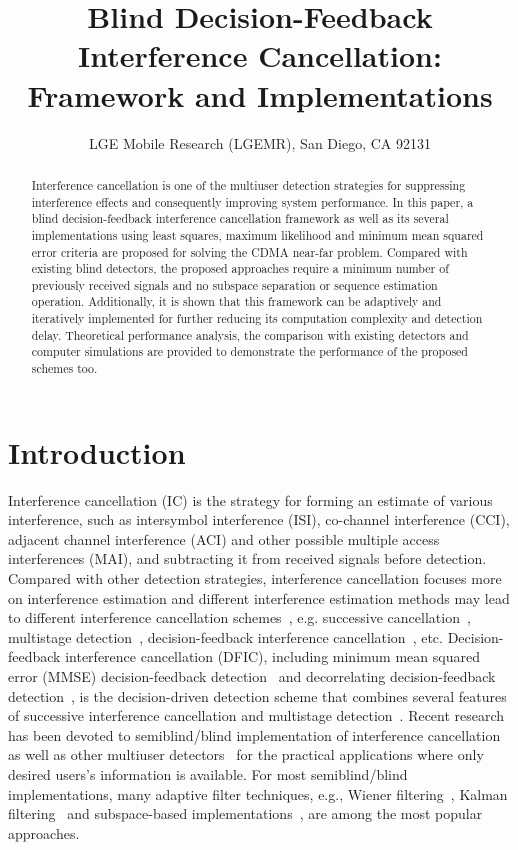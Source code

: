 \documentclass[a4paper,10pt,fleqn, twocolumn]{IEEETran}
\title{Blind Decision-Feedback Interference Cancellation: Framework and Implementations}
\author{LGE Mobile Research (LGEMR), San Diego, CA 92131}
\date{}
\begin{document}
\maketitle
\begin{abstract}\small
Interference cancellation is one of the multiuser detection
strategies for suppressing interference effects and consequently
improving system performance. In this paper, a blind
decision-feedback interference cancellation framework as well as
its several implementations using least squares, maximum
likelihood and minimum mean squared error criteria are proposed
for solving the CDMA near-far problem. Compared with existing
blind detectors, the proposed approaches require a minimum number
of previously received signals and no subspace separation or
sequence estimation operation. Additionally, it is shown that this
framework can be adaptively and iteratively implemented for
further reducing its computation complexity and detection delay.
Theoretical performance analysis, the comparison with existing
detectors and computer simulations are provided to demonstrate the
performance of the proposed schemes too.
\end{abstract}
\section{Introduction}
Interference cancellation (IC) is the strategy for forming an
estimate of various interference, such as intersymbol interference
(ISI), co-channel interference (CCI), adjacent channel
interference (ACI) and other possible multiple access
interferences (MAI), and subtracting it from received signals
before detection. Compared with other detection strategies,
interference cancellation focuses more on interference estimation
and different interference estimation methods may lead to
different interference cancellation schemes~\cite{Verd98,Wang02b},
e.g. successive cancellation~\cite{Kohno91}, multistage
detection~\cite{Vara88}, decision-feedback interference
cancellation~\cite{Kave85,Duel95}, etc. Decision-feedback
interference cancellation (DFIC), including minimum mean squared
error (MMSE) decision-feedback detection~\cite{Kave85} and
decorrelating decision-feedback detection~\cite{Duel95}, is the
decision-driven detection scheme that combines several features of
successive interference cancellation and multistage
detection~\cite{Verd98}. Recent research has been devoted to
semiblind/blind implementation of interference cancellation as
well as other multiuser
detectors~\cite{Madh94,Madh98,Wang98,Zhang02,Wang03d,Wang05A,Wang05B}
for the practical applications where only desired users's
information is available. For most semiblind/blind
implementations, many adaptive filter techniques, e.g., Wiener
filtering~\cite{Madh94}, Kalman filtering~\cite{Zhang02} and
subspace-based implementations~\cite{Wang98}, are among the most
popular approaches.
\end{document}
